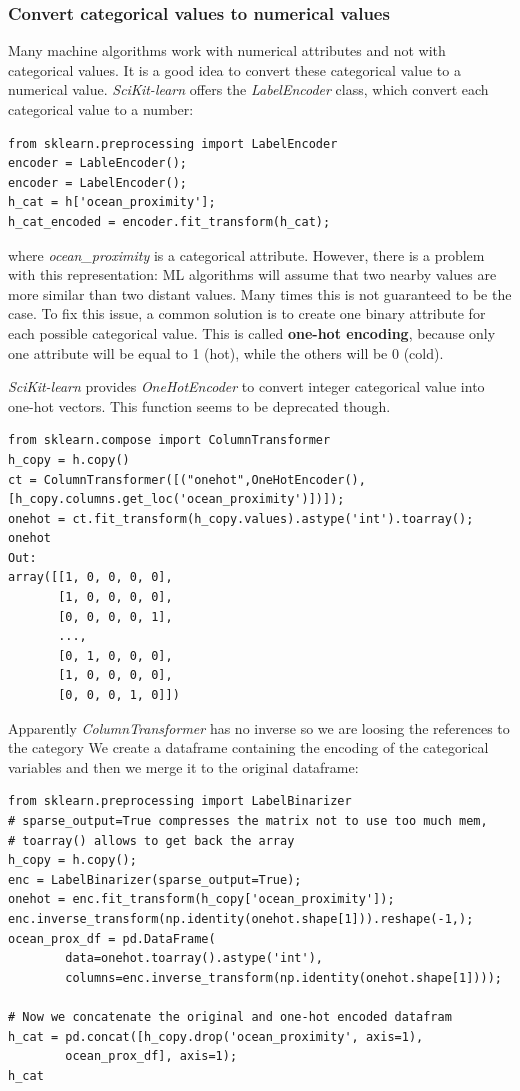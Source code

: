 \documentclass[12pt, letterpaper]{article}
\theoremstyle{definition}
\let\ti\textit
\let\tb\textbf
\begin{document}
\subsubsection{Convert categorical values to numerical values}
Many machine algorithms work with numerical attributes and not with categorical values. It is a good idea to convert these categorical value to a numerical value. \ti{SciKit-learn} offers the \ti{LabelEncoder} class, which convert each categorical value to a number:
\begin{lstlisting}[caption=Example of usage of \ti{LabelEncoder} class]
from sklearn.preprocessing import LabelEncoder
encoder = LableEncoder();
encoder = LabelEncoder();
h_cat = h['ocean_proximity'];
h_cat_encoded = encoder.fit_transform(h_cat);
\end{lstlisting}
where \ti{ocean\_proximity} is a categorical attribute. However, there is a problem with this representation:  ML algorithms will assume that two nearby values are more similar than two distant values. Many times this is not guaranteed to be the case. To fix this issue, a common solution is to create one binary attribute for each possible categorical value. This is called \tb{one-hot encoding}, because only one attribute will be equal to 1 (hot), while the others will be 0 (cold).

\ti{SciKit-learn} provides \ti{OneHotEncoder} to convert integer categorical value into one-hot vectors. This function seems to be deprecated though.

\begin{lstlisting}[caption=Usage of \ti{ColumnTransformer}]
from sklearn.compose import ColumnTransformer
h_copy = h.copy()
ct = ColumnTransformer([("onehot",OneHotEncoder(),[h_copy.columns.get_loc('ocean_proximity')])]);
onehot = ct.fit_transform(h_copy.values).astype('int').toarray();
onehot
Out:
array([[1, 0, 0, 0, 0],
       [1, 0, 0, 0, 0],
       [0, 0, 0, 0, 1],
       ...,
       [0, 1, 0, 0, 0],
       [1, 0, 0, 0, 0],
       [0, 0, 0, 1, 0]])
\end{lstlisting}
Apparently \ti{ColumnTransformer} has no inverse so we are loosing the references to the category
We create a dataframe containing the encoding of the categorical variables and then we merge it to the original dataframe:
\begin{lstlisting}[caption=Usage of \ti{LabelBinarizer}]
from sklearn.preprocessing import LabelBinarizer
# sparse_output=True compresses the matrix not to use too much mem, 
# toarray() allows to get back the array
h_copy = h.copy();
enc = LabelBinarizer(sparse_output=True);
onehot = enc.fit_transform(h_copy['ocean_proximity']);
enc.inverse_transform(np.identity(onehot.shape[1])).reshape(-1,);
ocean_prox_df = pd.DataFrame(
		data=onehot.toarray().astype('int'), 
		columns=enc.inverse_transform(np.identity(onehot.shape[1])));

# Now we concatenate the original and one-hot encoded datafram
h_cat = pd.concat([h_copy.drop('ocean_proximity', axis=1), 
		ocean_prox_df], axis=1);
h_cat
\end{lstlisting}
\end{document}

